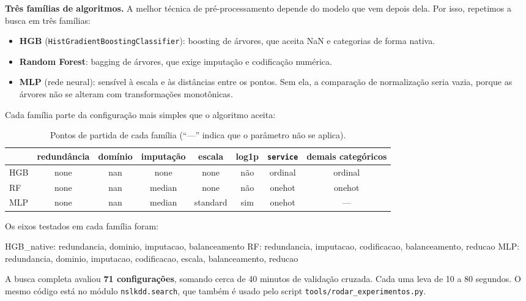 \documentclass[11pt,a4paper]{article}
\begin{document}
\textbf{Três famílias de algoritmos.} A melhor técnica de pré-processamento depende do modelo que vem depois dela. Por isso, repetimos a busca em três famílias:
\begin{itemize}
\item \textbf{HGB} (\texttt{HistGradientBoostingClassifier}): boosting de árvores, que aceita NaN e categorias de forma nativa.
\item \textbf{Random Forest}: bagging de árvores, que exige imputação e codificação numérica.
\item \textbf{MLP} (rede neural): sensível à escala e às distâncias entre os pontos. Sem ela, a comparação de normalização seria vazia, porque as árvores não se alteram com transformações monotônicas.
\end{itemize}

Cada família parte da configuração mais simples que o algoritmo aceita:

\begin{table}[H]
\centering
\caption{Pontos de partida de cada família (``---'' indica que o parâmetro não se aplica).}
\begin{adjustbox}{max width=\linewidth}
\begin{tabular}{lccccccc}
\toprule
 & redundância & domínio & imputação & escala & log1p & \texttt{service} & demais categóricos \\
\midrule
HGB & none & nan & none & none & não & ordinal & ordinal \\
RF  & none & nan & median & none & não & onehot & onehot \\
MLP & none & nan & median & standard & sim & onehot & --- \\
\bottomrule
\end{tabular}
\end{adjustbox}
\end{table}

Os eixos testados em cada família foram:

\begin{saida}
HGB_native: redundancia, dominio, imputacao, balanceamento
RF:         redundancia, imputacao, codificacao, balanceamento, reducao
MLP:        redundancia, dominio, imputacao, codificacao, escala, balanceamento, reducao
\end{saida}

A busca completa avaliou \textbf{71 configurações}, somando cerca de 40 minutos de validação cruzada. Cada uma leva de 10 a 80 segundos. O mesmo código está no módulo \texttt{nslkdd.search}, que também é usado pelo script \texttt{tools/rodar\_experimentos.py}.
\end{document}

